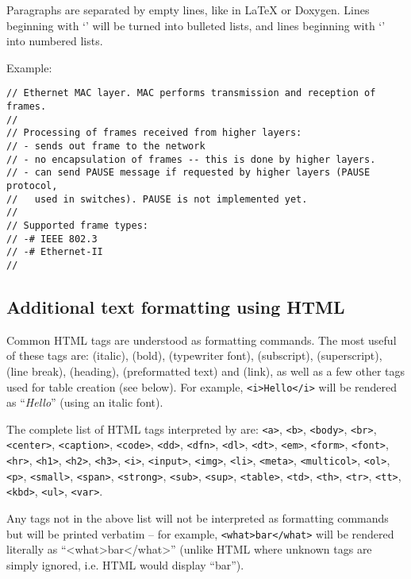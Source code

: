 Paragraphs are separated by empty lines, like in LaTeX or Doxygen.
Lines beginning with `\ttt{-}' will be turned into bulleted lists,
and lines beginning with `\ttt{-\#}' into numbered lists.

Example:

\begin{verbatim}
// Ethernet MAC layer. MAC performs transmission and reception of frames.
//
// Processing of frames received from higher layers:
// - sends out frame to the network
// - no encapsulation of frames -- this is done by higher layers.
// - can send PAUSE message if requested by higher layers (PAUSE protocol,
//   used in switches). PAUSE is not implemented yet.
//
// Supported frame types:
// -# IEEE 802.3
// -# Ethernet-II
//
\end{verbatim}

\subsection{Additional text formatting using HTML}

Common HTML tags are understood as formatting commands.
The most useful of these tags are:  (italic),
 (bold),  (typewriter font),
 (subscript),  (superscript),
 (line break),  (heading),
 (preformatted text) and  (link),
as well as a few other tags used for table creation (see below).
For example, \texttt{<i>Hello</i>} will be rendered as ``\textit{Hello}''
(using an italic font).

The complete list of HTML tags interpreted by  are:
\texttt{<a>}, \texttt{<b>}, \texttt{<body>}, \texttt{<br>}, \texttt{<center>},
\texttt{<caption>}, \texttt{<code>}, \texttt{<dd>}, \texttt{<dfn>}, \texttt{<dl>},
\texttt{<dt>}, \texttt{<em>}, \texttt{<form>}, \texttt{<font>}, \texttt{<hr>},
\texttt{<h1>}, \texttt{<h2>}, \texttt{<h3>}, \texttt{<i>}, \texttt{<input>}, \texttt{<img>},
\texttt{<li>}, \texttt{<meta>}, \texttt{<multicol>}, \texttt{<ol>}, \texttt{<p>}, \texttt{<small>},
\texttt{<span>}, \texttt{<strong>},
\texttt{<sub>}, \texttt{<sup>}, \texttt{<table>}, \texttt{<td>}, \texttt{<th>}, \texttt{<tr>},
\texttt{<tt>}, \texttt{<kbd>}, \texttt{<ul>}, \texttt{<var>}.

Any tags not in the above list will not be interpreted as formatting commands
but will be printed verbatim -- for example, \texttt{<what>bar</what>}
will be rendered literally as ``<what>bar</what>'' (unlike HTML where
unknown tags are simply ignored, i.e. HTML would display ``bar'').

